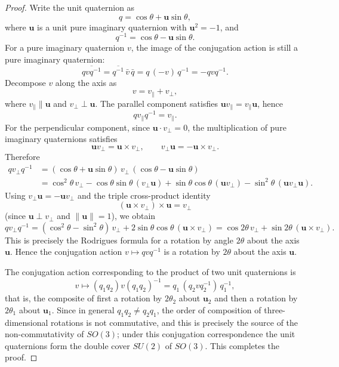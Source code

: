 \begin{proof}
Write the unit quaternion as
\[
q=\cos\theta+\mathbf u\sin\theta,
\]
where $\mathbf u$ is a unit pure imaginary quaternion with $\mathbf u^2=-1$, and
\[
q^{-1}=\cos\theta-\mathbf u\sin\theta.
\]
For a pure imaginary quaternion $v$, the image of the conjugation action is still a pure imaginary quaternion:
\[
\overline{qvq^{-1}}
=
\overline{q^{-1}}\,\bar v\,\bar q
=
q\,(-v)\,q^{-1}
=
-qvq^{-1}.
\]
Decompose $v$ along the axis as
\[
v=v_\parallel+v_\perp,
\]
where $v_\parallel\parallel \mathbf u$ and $v_\perp\perp \mathbf u$. The parallel component satisfies $\mathbf u v_\parallel=v_\parallel \mathbf u$, hence
\[
qv_\parallel q^{-1}=v_\parallel.
\]
For the perpendicular component, since $\mathbf u\cdot v_\perp=0$, the multiplication of pure imaginary quaternions satisfies
\[
\mathbf u v_\perp=\mathbf u\times v_\perp,\qquad
v_\perp \mathbf u=-\mathbf u\times v_\perp.
\]
Therefore
\begin{align*}
qv_\perp q^{-1}
&=
(\cos\theta+\mathbf u\sin\theta)\,v_\perp\,(\cos\theta-\mathbf u\sin\theta) \\
&=
\cos^2\theta\,v_\perp
-\cos\theta\sin\theta\,(v_\perp \mathbf u)
+\sin\theta\cos\theta\,(\mathbf u v_\perp)
-\sin^2\theta\,(\mathbf u v_\perp \mathbf u).
\end{align*}
Using $v_\perp \mathbf u=-\mathbf u v_\perp$ and the triple cross-product identity
\[
(\mathbf u\times v_\perp)\times \mathbf u=v_\perp
\]
(since $\mathbf u\perp v_\perp$ and $\|\mathbf u\|=1$), we obtain
\[
qv_\perp q^{-1}
=
(\cos^2\theta-\sin^2\theta)\,v_\perp
+
2\sin\theta\cos\theta\,(\mathbf u\times v_\perp)
=
\cos 2\theta\,v_\perp
+
\sin 2\theta\,(\mathbf u\times v_\perp).
\]
This is precisely the Rodrigues formula for a rotation by angle $2\theta$ about the axis $\mathbf u$. Hence the conjugation action $v\mapsto qvq^{-1}$ is a rotation by $2\theta$ about the axis $\mathbf u$.

The conjugation action corresponding to the product of two unit quaternions is
\[
v\longmapsto (q_1q_2)v(q_1q_2)^{-1}
=
q_1\,(q_2 v q_2^{-1})\,q_1^{-1},
\]
that is, the composite of first a rotation by $2\theta_2$ about $\mathbf u_2$ and then a rotation by $2\theta_1$ about $\mathbf u_1$. Since in general $q_1q_2\neq q_2q_1$, the order of composition of three-dimensional rotations is not commutative, and this is precisely the source of the non-commutativity of $SO(3)$; under this conjugation correspondence the unit quaternions form the double cover $SU(2)$ of $SO(3)$. This completes the proof.
\end{proof}

